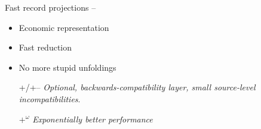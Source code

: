 \begin{subsecframe}{Fast record projections -- }
  \begin{itemize}
  \item Economic representation
  \item Fast reduction
  \item No more stupid unfoldings
  \end{itemize}
  
  \begin{itemize}
  \item[+/+--] \emph{Optional, backwards-compatibility layer,
      small source-level incompatibilities}.
  \item[${+}^{ω}$] \emph{Exponentially better performance}
  \end{itemize}


\end{subsecframe}

